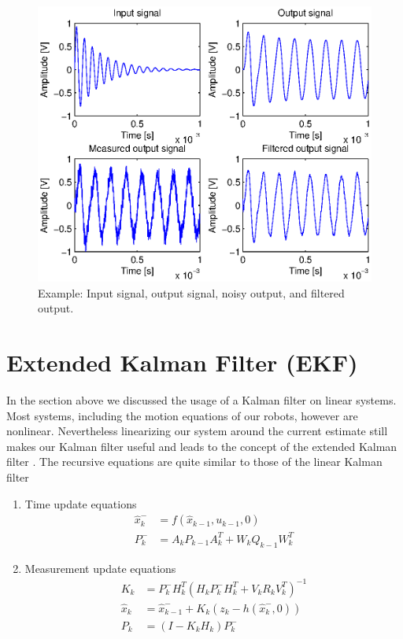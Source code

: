 \begin{figure}[htbp]
	\centering
    	\includegraphics[width=12cm]{./3_KalmanFilter/KFchart}
  	\caption{Example: Input signal, output signal, noisy output, and filtered output.}
  	\label{KFchart}
\end{figure}

\section{Extended Kalman Filter (EKF)}

In the section above we discussed the usage of a Kalman filter on linear systems. Most systems, including the motion equations of our robots, however are nonlinear. Nevertheless linearizing our system around the current estimate still makes our Kalman filter useful and leads to the concept of the extended Kalman filter \cite{IntroKF}. The recursive equations are quite similar to those of the linear Kalman filter
\newline
\begin{enumerate}
	\item Time update equations
	\begin{equation}\label{TupEqEKF}
		\begin{aligned}
    			\hat{x}_{k}^- &= f(\hat{x}_{k-1},u_{k-1},0) \\
    			P_{k}^{-} &= A_kP_{k-1}A_k^T+W_k Q_{k-1} W_k^T
  		\end{aligned}
	\end{equation}
	\item Measurement update equations
	\begin{equation}\label{MupEqEKF}
		\begin{aligned}
    			K_{k} &= P_{k}^- H_k^T(H_k P_k^- H_k^T+V_k R_k V_k^T)^{-1} \\
    			\hat{x}_k &= \hat{x}_{k-1}^- + K_{k}(z_k - h(\hat{x}_k^-, 0)) \\
			P_k &= (I-K_k H_k)P_k^-
  		\end{aligned}
	\end{equation}
\end{enumerate}

